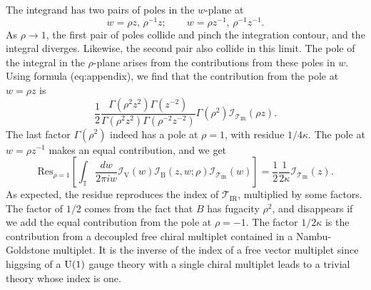 The integrand has two pairs of poles in the $w$-plane at
\begin{equation}
    w  =  \rho z,  \,  \rho^{-1}z;
    \quad\quad
    w  =  \rho z^{-1},  \,  \rho^{-1}z^{-1}.
\end{equation}
 As $\rho\rightarrow1$, the first pair of poles collide and pinch
the integration contour, and the integral diverges. Likewise, the
second pair also collide in this limit. The pole of the integral in
the $\rho$-plane arises from the contributions from these poles in
$w$. Using formula (eq:appendix), we find that the contribution from
the pole at $w=\rho z$ is
\begin{equation}
    \frac{1}{2}\frac{\Gamma(\rho^{2}z^{2})\Gamma(z^{-2})}{\Gamma(\rho^{2}z^{2})\Gamma(\rho^{-2}z^{-2})}
    \Gamma(\rho^{2})
    \mathcal{I}_{\mathcal{T}_{\mathrm{IR}}}(\rho z).
\end{equation}
 The last factor $\Gamma(\rho^{2})$ indeed has a pole at $\rho=1$,
with residue $1/4\kappa$. The pole at $w=\rho z^{-1}$ makes an equal
contribution, and we get
\begin{equation}
    \mathrm{Res}_{\rho=1}
    \left[
      \int_{\mathbb{T}}\frac{dw}{2\pi iw}
      \mathcal{I}_{\mathrm{V}}(w)
      \mathcal{I}_{\mathrm{B}}(z,w;\rho)
      \mathcal{I}_{\mathcal{T}_{\mathrm{IR}}}(w)
    \right]
      =
        \frac{1}{2}  \frac{1}{2\kappa}
        \mathcal{I}_{\mathcal{T}_{\mathrm{IR}}}(z).
\end{equation}
As expected, the residue reproduces the index of $\mathcal{T}_{\mathrm{IR}}$,
multiplied by some factors. The factor of $1/2$ comes from the fact
that $B$ has fugacity $\rho^{2}$, and disappears if we add the equal
contribution from the pole at $\rho=-1$. The factor $1/2\kappa$
is the contribution from a decoupled free chiral multiplet contained
in a Nambu-Goldstone multiplet. It is the inverse of the index of
a free vector multiplet since higgsing of a $\mathrm{U}(1)$ gauge theory with
a single chiral multiplet leads to a trivial theory whose index is
one.

